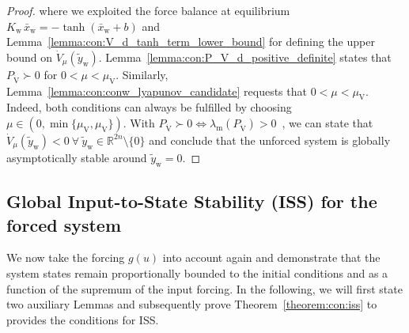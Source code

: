 \begin{proof}
    where we exploited the force balance at equilibrium $K_\mathrm{w} \, \bar{x}_\mathrm{w} = -\tanh(\bar{x}_\mathrm{w} + b)$ and Lemma~\ref{lemma:con:V_d_tanh_term_lower_bound} for defining the upper bound on $\dot{V}_\mu(\tilde{y}_\mathrm{w})$. Lemma~\ref{lemma:con:P_V_d_positive_definite} states that $P_{\dot{\mathrm{V}}} \succ 0$ for $0 < \mu < \mu_{\dot{\mathrm{V}}}$. Similarly, Lemma~\ref{lemma:con:conw_lyapunov_candidate} requests that $0 < \mu < \mu_{\mathrm{V}}$. Indeed, both conditions can always be fulfilled by choosing $\mu \in \left (0, \min \{ \mu_{\mathrm{V}}, \mu_{\dot{\mathrm{V}}} \} \right )$. 
    With $P_{\dot{\mathrm{V}}} \succ 0 \Leftrightarrow \lambda_\mathrm{m}\left(P_{\dot{\mathrm{V}}} \right) > 0$~\cite{golub2013matrix}, we can state that $\dot{V}_\mu(\tilde{y}_\mathrm{w}) < 0 \: \forall \: \tilde{y}_\mathrm{w} \in \mathbb{R}^{2n} \setminus \{0 \}$ and conclude that the unforced system is globally asymptotically stable around $\tilde{y}_\mathrm{w} = 0$.
\end{proof}

\subsection{Global Input-to-State Stability (ISS) for the forced system} 
We now take the forcing $g(u)$ into account again and demonstrate that the system states remain proportionally bounded to the initial conditions and as a function of the supremum of the input forcing.
In the following, we will first state two auxiliary Lemmas and subsequently prove Theorem~\ref{theorem:con:iss} to provides the conditions for \gls{ISS}.

